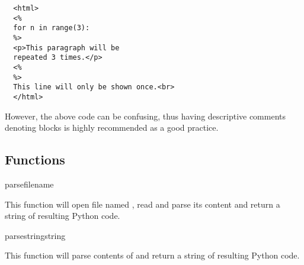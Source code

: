 \begin{verbatim}
  <html>
  <%
  for n in range(3):
  %>
  <p>This paragraph will be 
  repeated 3 times.</p>
  <%
  %>
  This line will only be shown once.<br>
  </html>
\end{verbatim}

However, the above code can be confusing, thus having descriptive
comments denoting blocks is highly recommended as a good practice.

\subsection{Functions\label{pyapi-psp-funcs}}

\begin{funcdesc}{parse}{filename}

  This function will open file named , read and parse its
  content and return a string of resulting Python code.

\end{funcdesc}

\begin{funcdesc}{parsestring}{string}

  This function will parse contents of  and return a string
  of resulting Python code.

\end{funcdesc}


